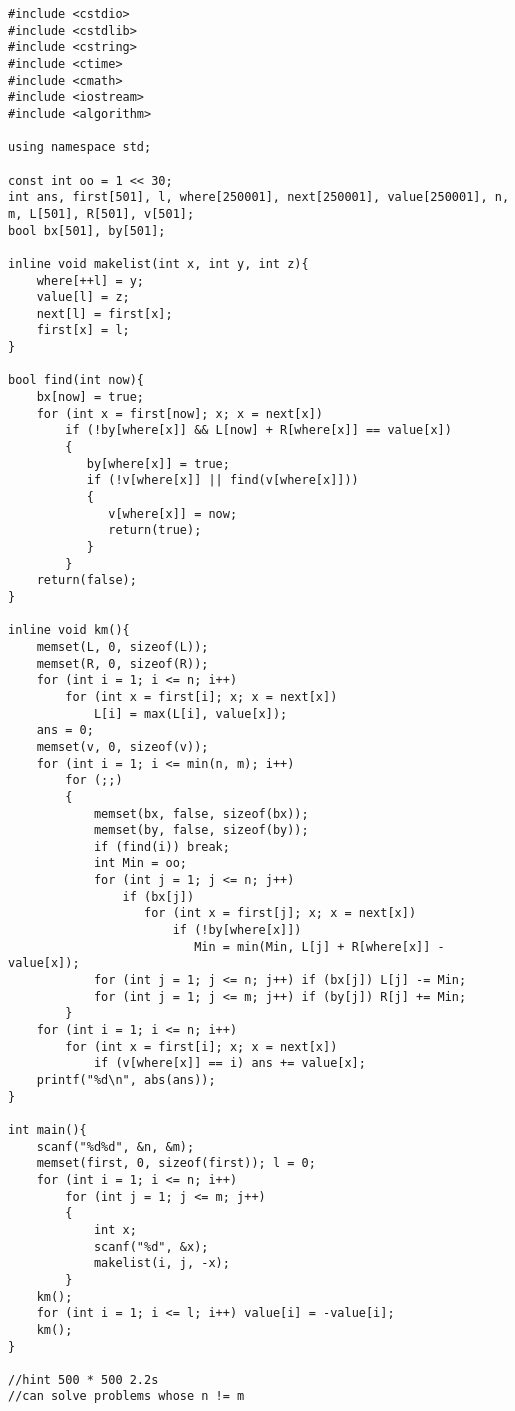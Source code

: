 \begin{lstlisting}
#include <cstdio>
#include <cstdlib>
#include <cstring>
#include <ctime>
#include <cmath>
#include <iostream>
#include <algorithm>

using namespace std;

const int oo = 1 << 30;
int ans, first[501], l, where[250001], next[250001], value[250001], n, m, L[501], R[501], v[501];
bool bx[501], by[501];

inline void makelist(int x, int y, int z){
    where[++l] = y;
    value[l] = z;
    next[l] = first[x];
    first[x] = l;
}

bool find(int now){
    bx[now] = true;
    for (int x = first[now]; x; x = next[x])
        if (!by[where[x]] && L[now] + R[where[x]] == value[x])
        {
           by[where[x]] = true;
           if (!v[where[x]] || find(v[where[x]]))
           {
              v[where[x]] = now;
              return(true);
           }
        }
    return(false);
}

inline void km(){
    memset(L, 0, sizeof(L));
    memset(R, 0, sizeof(R));
    for (int i = 1; i <= n; i++)
        for (int x = first[i]; x; x = next[x])
            L[i] = max(L[i], value[x]);
    ans = 0;
    memset(v, 0, sizeof(v));
    for (int i = 1; i <= min(n, m); i++) 
        for (;;)
        {
            memset(bx, false, sizeof(bx));
            memset(by, false, sizeof(by));
            if (find(i)) break;
            int Min = oo;
            for (int j = 1; j <= n; j++) 
                if (bx[j]) 
                   for (int x = first[j]; x; x = next[x])
                       if (!by[where[x]]) 
                          Min = min(Min, L[j] + R[where[x]] - value[x]);
            for (int j = 1; j <= n; j++) if (bx[j]) L[j] -= Min;
            for (int j = 1; j <= m; j++) if (by[j]) R[j] += Min;
        }
    for (int i = 1; i <= n; i++)
        for (int x = first[i]; x; x = next[x])
            if (v[where[x]] == i) ans += value[x];
    printf("%d\n", abs(ans));
}

int main(){
    scanf("%d%d", &n, &m);
    memset(first, 0, sizeof(first)); l = 0;
    for (int i = 1; i <= n; i++) 
        for (int j = 1; j <= m; j++) 
        {
            int x;
            scanf("%d", &x);
            makelist(i, j, -x);
        }
    km();
    for (int i = 1; i <= l; i++) value[i] = -value[i];
    km();
}

//hint 500 * 500 2.2s
//can solve problems whose n != m
\end{lstlisting}
